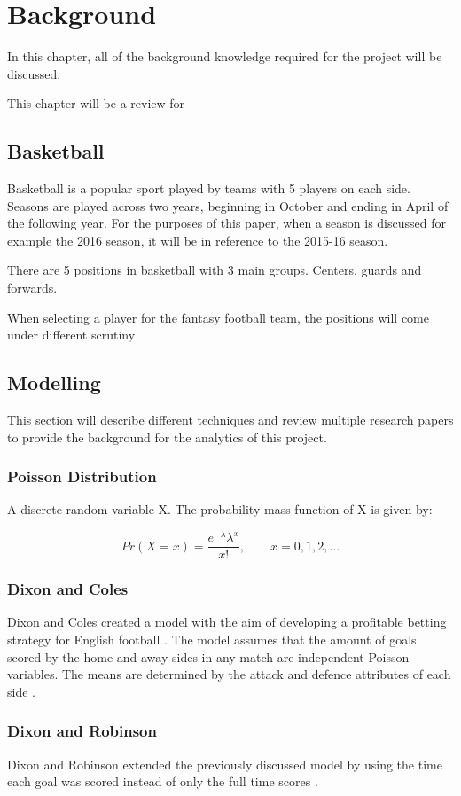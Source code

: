 \chapter{Background}

In this chapter, all of the background knowledge required for the project will be discussed.

This chapter will be a review for\cite{theoretical_stat}

\section{Basketball}
Basketball is a popular sport played by teams with 5 players on each side.  Seasons are played across two years, beginning in October and ending in April of the following year.  For the purposes of this paper, when a season is discussed for example the 2016 season, it will be in reference to the 2015-16 season.

There are 5 positions in basketball with 3 main groups.  Centers, guards and forwards.

When selecting a player for the fantasy football team, the positions will come under different scrutiny 

\section{Modelling}
This section will describe different techniques and review multiple research papers to provide the background for the analytics of this project.

\subsection{Poisson Distribution}
A discrete random variable X.  The probability mass function of X is given by: \cite{poisson}

\begin{equation}
    Pr(X = x) = \frac{e^{-\lambda}\lambda^{x}}{x!}, \qquad x=0,1,2,\ldots
\end{equation}

\subsection{Dixon and Coles}
Dixon and Coles created a model with the aim of developing a profitable betting strategy for English football \cite{dixon_coles}.  The model assumes that the amount of goals scored by the home and away sides in any match are independent Poisson variables.  The means are determined by the attack and defence attributes of each side \cite{dixon_coles}.

\subsection{Dixon and Robinson}
Dixon and Robinson extended the previously discussed model by using the time each goal was scored instead of only the full time scores \cite{dixon_robinson}.  